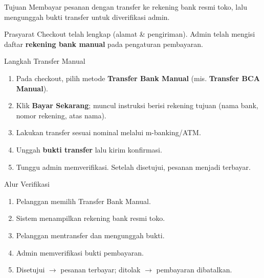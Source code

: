 
\begin{flowsection}{Tujuan}
Membayar pesanan dengan transfer ke rekening bank resmi toko, lalu mengunggah
bukti transfer untuk diverifikasi admin.
\end{flowsection}

\begin{flowsection}{Prasyarat}
Checkout telah lengkap (alamat \& pengiriman). Admin telah mengisi daftar
\textbf{rekening bank manual} pada pengaturan pembayaran.
\end{flowsection}

\begin{flowsection}{Langkah Transfer Manual}
\begin{enumerate}
  \item Pada checkout, pilih metode \textbf{Transfer Bank Manual}
        (mis. \textbf{Transfer BCA Manual}).
  \item Klik \textbf{Bayar Sekarang}; muncul instruksi berisi rekening tujuan
        (nama bank, nomor rekening, atas nama).
  \item Lakukan transfer sesuai nominal melalui m-banking/ATM.
  \item Unggah \textbf{bukti transfer} lalu kirim konfirmasi.
  \item Tunggu admin memverifikasi. Setelah disetujui, pesanan menjadi terbayar.
\end{enumerate}
\end{flowsection}


\begin{flowsection}{Alur Verifikasi}
\begin{enumerate}
  \item Pelanggan memilih Transfer Bank Manual.
  \item Sistem menampilkan rekening bank resmi toko.
  \item Pelanggan mentransfer dan mengunggah bukti.
  \item Admin memverifikasi bukti pembayaran.
  \item Disetujui $\rightarrow$ pesanan terbayar; ditolak $\rightarrow$ pembayaran dibatalkan.
\end{enumerate}
\end{flowsection}

